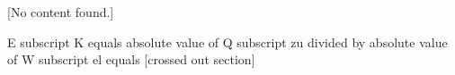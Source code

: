 [No content found.]

E subscript K equals absolute value of Q subscript zu divided by absolute value of W subscript el equals [crossed out section]